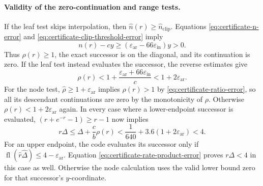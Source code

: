 \paragraph{Validity of the zero-continuation and range tests.}
If the leaf test skips interpolation, then $\widehat n(r)\ge\widehat n_{\mathrm{clip}}$.
Equations \eqref{eq:certificate-n-error} and
\eqref{eq:certificate-clip-threshold-error} imply
\[
 n(r)-cy\ge
  (\varepsilon_{\mathrm{ar}}-66\varepsilon_{\mathrm{in}})y>0.
\]
Thus $\rho(r)\ge1$, the exact successor is on the diagonal, and its
continuation is zero. If the leaf test instead evaluates the successor,
the reverse estimates give
\[
 \rho(r)<1+
 \frac{\varepsilon_{\mathrm{ar}}+66\varepsilon_{\mathrm{in}}}{c}
 <1+2\varepsilon_{\mathrm{ar}}.
\]
For the node test, $\widehat\rho\ge1+\varepsilon_{\mathrm{ar}}$ implies
$\rho(r)>1$ by \eqref{eq:certificate-ratio-error}, so all its descendant
continuations are zero by the monotonicity of $\rho$.
Otherwise $\rho(r)<1+2\varepsilon_{\mathrm{ar}}$ again.
In every case where a lower-endpoint successor is evaluated,
$(r+e^{-r}-1)\ge r-1$ now implies
\begin{equation}
 r\Delta\le\Delta+\frac cb\rho(r)
 <\frac1{640}+3.6(1+2\varepsilon_{\mathrm{ar}})<4.
 \label{eq:certificate-successor-rate-range}
\end{equation}
For an upper endpoint, the code evaluates its successor only if
$\operatorname{fl}(\widehat r\widehat\Delta)
 \le4-\varepsilon_{\mathrm{ar}}$.
Equation \eqref{eq:certificate-rate-product-error} proves $r\Delta<4$
in this case as well. Otherwise the node calculation uses the valid
lower bound zero for that successor's $y$-coordinate.

